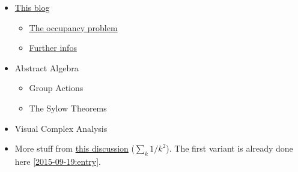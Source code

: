 

\begin{itemize}

\item \href{https://probabilityandstats.wordpress.com}{This blog}

\begin{itemize}

\item \href{https://probabilityandstats.wordpress.com/2010/03/27/the-occupancy-problem/}{The occupancy problem}

  \item \href{https://probabilityandstats.wordpress.com/2010/04/04/a-formula-for-the-occupancy-problem/}{Further infos}
  
\end{itemize}

\item Abstract Algebra

\begin{itemize}

\item Group Actions

\item The Sylow Theorems
  
\end{itemize}

\item Visual Complex Analysis

\item More stuff from  \href{http://math.stackexchange.com/questions/8337/different-methods-to-compute-sum-limits-k-1-infty-frac1k2}{this discussion} ($\sum_k 1/k^2$). The first variant is already done here \ref{2015-09-19:entry}.


\end{itemize}


